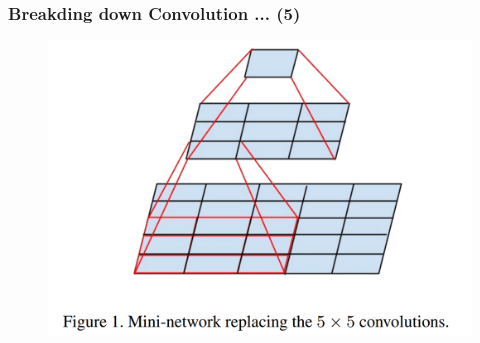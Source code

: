 \documentclass{beamer}
\begin{document}
\begin{frame}
	\frametitle{Breakding down Convolution ... (5)}
	\begin{figure}
		\includegraphics[width=\textwidth]{./figures/edit/5x5.png}
	\end{figure}
\end{frame}
\end{document}
